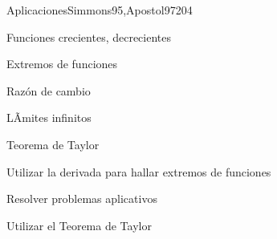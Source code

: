 \begin{syllabus}
\begin{unit}{Aplicaciones}{Simmons95,Apostol97}{20}{4}
   \begin{topics}
      \item Funciones crecientes, decrecientes
      \item Extremos de funciones
      \item Razón de cambio
      \item LÃ­mites infinitos
      \item Teorema de Taylor
   \end{topics}

   \begin{learningoutcomes}
      \item Utilizar la derivada para hallar extremos de funciones
      \item Resolver problemas aplicativos
      \item Utilizar el Teorema de Taylor
      \end{learningoutcomes}
\end{unit}



\begin{coursebibliography}
\end{coursebibliography}

\end{syllabus}
